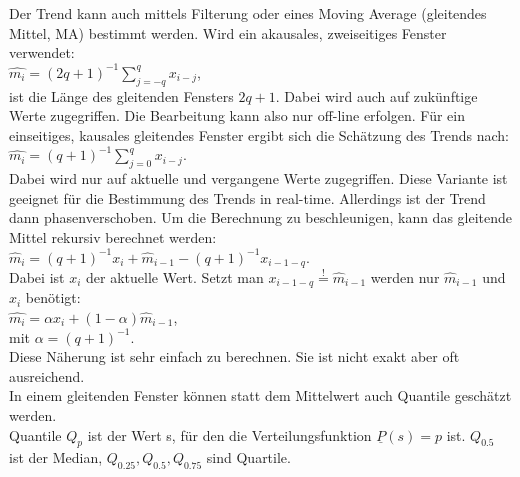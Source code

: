 Der Trend kann auch mittels Filterung oder eines Moving Average (gleitendes Mittel, MA) bestimmt werden. Wird ein akausales, zweiseitiges Fenster verwendet:\\
 $\hat{m_i}=(2q+1)^{-1}\sum\limits_{j=-q}^q x_{i-j}$,\\
ist die Länge des gleitenden Fensters $2q + 1$. Dabei wird auch auf zukünftige Werte zugegriffen. Die Bearbeitung kann also nur off-line erfolgen. Für ein einseitiges, kausales gleitendes Fenster ergibt sich die Schätzung des Trends nach:
 $\hat{m_i}=(q+1)^{-1}\sum\limits_{j=0}^q x_{i-j}$.\\
Dabei wird nur auf aktuelle und vergangene Werte zugegriffen. Diese Variante ist geeignet für die Bestimmung des Trends in real-time. Allerdings ist der Trend dann phasenverschoben. Um die Berechnung zu beschleunigen, kann das gleitende Mittel rekursiv berechnet werden:
  $\hat m_i=(q+1)^{-1} x_i +  \hat m_{i-1}-(q+1)^{-1} x_{i-1-q}$.\\
Dabei ist $x_i$ der aktuelle Wert. Setzt man $x_{i-1-q}\stackrel{!}{=}\hat m_{i-1}$ werden nur $\hat m_{i-1}$ und $x_i$ benötigt:\\
 $\hat{m_i}= \alpha x_i + (1-\alpha) \hat m_{i-1}$, \\
 mit $\alpha = (q+1)^{-1}$. \\
Diese Näherung ist sehr einfach zu berechnen. Sie ist nicht exakt aber oft ausreichend.\\
In einem gleitenden Fenster können statt dem Mittelwert auch Quantile geschätzt werden.\\
Quantile $Q_p$ ist der Wert s, für den die Verteilungsfunktion $\underline P(s)=p$ ist. $Q_{0.5}$ ist der Median, $Q_{0.25},Q_{0.5},Q_{0.75}$ sind Quartile. 


